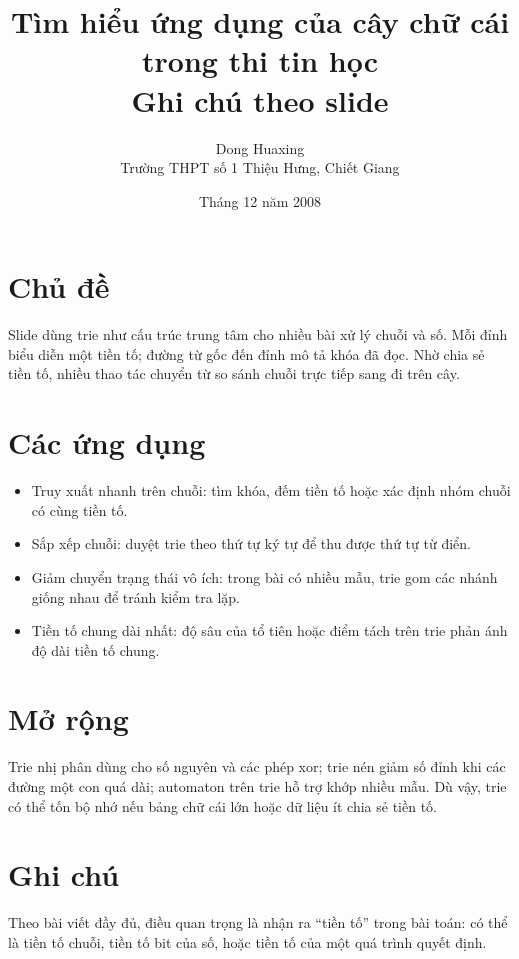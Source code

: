 \documentclass[11pt]{article}
\title{Tìm hiểu ứng dụng của cây chữ cái trong thi tin học\\{\large Ghi chú theo slide}}
\author{Dong Huaxing\\Trường THPT số 1 Thiệu Hưng, Chiết Giang}
\date{Tháng 12 năm 2008}
\begin{document}
\maketitle


\section{Chủ đề}

Slide dùng trie như cấu trúc trung tâm cho nhiều bài xử lý chuỗi và số. Mỗi
đỉnh biểu diễn một tiền tố; đường từ gốc đến đỉnh mô tả khóa đã đọc. Nhờ chia
sẻ tiền tố, nhiều thao tác chuyển từ so sánh chuỗi trực tiếp sang đi trên cây.

\section{Các ứng dụng}

\begin{itemize}
  \item Truy xuất nhanh trên chuỗi: tìm khóa, đếm tiền tố hoặc xác định nhóm
  chuỗi có cùng tiền tố.
  \item Sắp xếp chuỗi: duyệt trie theo thứ tự ký tự để thu được thứ tự từ
  điển.
  \item Giảm chuyển trạng thái vô ích: trong bài có nhiều mẫu, trie gom các
  nhánh giống nhau để tránh kiểm tra lặp.
  \item Tiền tố chung dài nhất: độ sâu của tổ tiên hoặc điểm tách trên trie
  phản ánh độ dài tiền tố chung.
\end{itemize}

\section{Mở rộng}

Trie nhị phân dùng cho số nguyên và các phép xor; trie nén giảm số đỉnh khi
các đường một con quá dài; automaton trên trie hỗ trợ khớp nhiều mẫu. Dù vậy,
trie có thể tốn bộ nhớ nếu bảng chữ cái lớn hoặc dữ liệu ít chia sẻ tiền tố.

\section{Ghi chú}

Theo bài viết đầy đủ, điều quan trọng là nhận ra ``tiền tố'' trong bài toán:
có thể là tiền tố chuỗi, tiền tố bit của số, hoặc tiền tố của một quá trình
quyết định.
\end{document}
